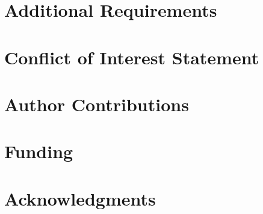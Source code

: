 \documentclass[utf8]{frontiersSCNS} %
\begin{document}
\section*{Additional Requirements}

\section*{Conflict of Interest Statement}

\section*{Author Contributions}

\section*{Funding}

\section*{Acknowledgments}
\end{document}
